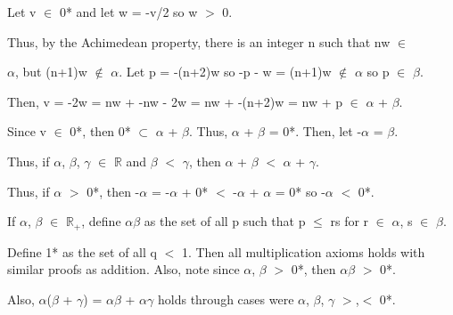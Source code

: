 \begin{adjustbox}{minipage=16cm, right, vspace=0.1cm 0cm}
			\qquad Let v $\in$ 0* and let w = -v/2 so w $>$ 0.

			\qquad Thus, by the Achimedean property, there is an integer n such that
			nw $\in$

			\qquad $\alpha$, but (n+1)w $\not \in$ $\alpha$.
			Let p = -(n+2)w so -p - w = (n+1)w $\not \in$ $\alpha$ so p $\in$ $\beta$.

			\qquad Then, v = -2w = nw + -nw - 2w = nw + -(n+2)w = nw + p $\in$ $\alpha$ + $\beta$.

			\qquad Since v $\in$ 0*, then 0* $\subset$ $\alpha$ + $\beta$.
			Thus, $\alpha$ + $\beta$ = 0*. Then, let -$\alpha$ = $\beta$.

		Thus, if $\alpha$, $\beta$, $\gamma$ $\in$ $\mathbb{R}$ and $\beta$ $<$ $\gamma$, then
		$\alpha$ + $\beta$ $<$ $\alpha$ + $\gamma$.

		Thus, if $\alpha$ $>$ 0*, then -$\alpha$ = -$\alpha$ + 0* $<$ -$\alpha$ + $\alpha$ = 0*
		so -$\alpha$ $<$ 0*.

		If $\alpha$, $\beta$ $\in$ $\mathbb{R}_+$, define $\alpha$$\beta$ as the set of all p
		such that p $\leq$ rs for r $\in$ $\alpha$, s $\in$ $\beta$.

		Define 1* as the set of all q $<$ 1.
		Then all multiplication axioms holds with similar proofs as addition.
		Also, note since $\alpha$, $\beta$ $>$ 0*, then $\alpha$$\beta$ $>$ 0*.

		Also, $\alpha$($\beta$ + $\gamma$) = $\alpha$$\beta$ + $\alpha$$\gamma$ holds
		through cases were $\alpha$, $\beta$, $\gamma$ $>$,$<$ 0*.
	\end{adjustbox}




	